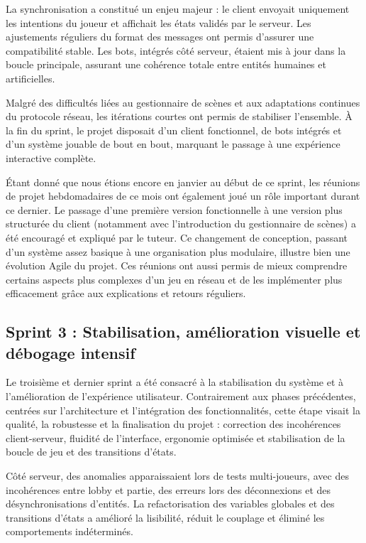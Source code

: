 \documentclass[a4paper, 11pt]{article}
\begin{document}
La synchronisation a constitué un enjeu majeur : le client envoyait uniquement les intentions du joueur et affichait les états validés par le serveur. Les ajustements réguliers du format des messages ont permis d’assurer une compatibilité stable. Les bots, intégrés côté serveur, étaient mis à jour dans la boucle principale, assurant une cohérence totale entre entités humaines et artificielles.

Malgré des difficultés liées au gestionnaire de scènes et aux adaptations continues du protocole réseau, les itérations courtes ont permis de stabiliser l’ensemble. À la fin du sprint, le projet disposait d’un client fonctionnel, de bots intégrés et d’un système jouable de bout en bout, marquant le passage à une expérience interactive complète.

Étant donné que nous étions encore en janvier au début de ce sprint, les réunions de projet hebdomadaires de ce mois ont également joué un rôle important durant ce dernier. Le passage d’une première version fonctionnelle à une version plus structurée du client (notamment avec l’introduction du gestionnaire de scènes) a été encouragé et expliqué par le tuteur. Ce changement de conception, passant d’un système assez basique à une organisation plus modulaire, illustre bien une évolution Agile du projet. Ces réunions ont aussi permis de mieux comprendre certains aspects plus complexes d'un jeu en réseau et de les implémenter plus efficacement grâce aux explications et retours réguliers.

\subsection{Sprint 3 : Stabilisation, amélioration visuelle et débogage intensif}

Le troisième et dernier sprint a été consacré à la stabilisation du système et à l’amélioration de l’expérience utilisateur. Contrairement aux phases précédentes, centrées sur l’architecture et l’intégration des fonctionnalités, cette étape visait la qualité, la robustesse et la finalisation du projet : correction des incohérences client-serveur, fluidité de l’interface, ergonomie optimisée et stabilisation de la boucle de jeu et des transitions d’états.

Côté serveur, des anomalies apparaissaient lors de tests multi-joueurs, avec des incohérences entre lobby et partie, des erreurs lors des déconnexions et des désynchronisations d’entités. La refactorisation des variables globales et des transitions d’états a amélioré la lisibilité, réduit le couplage et éliminé les comportements indéterminés.
\end{document}
